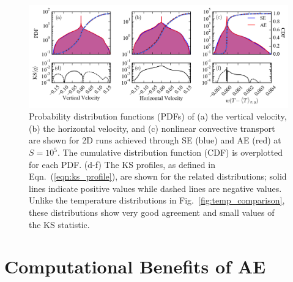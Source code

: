 \documentclass[aps, pre, onecolumn, nofootinbib, notitlepage, groupedaddress, amsfonts, amssymb, amsmath, longbibliography]{revtex4-1}
\begin{document}
\begin{figure}[t]
\includegraphics[width=\textwidth]{./figs/pdf_comparison.png}
\caption{Probability distribution functions (PDFs) of (a) the vertical velocity, (b) the horizontal velocity, and (c) nonlinear
convective transport are shown for 2D runs achieved through SE (blue) and AE (red)
at $S = 10^{5}$.  The cumulative distribution function (CDF) is overplotted for each PDF. 
(d-f) The KS profiles, as defined in Eqn.~(\ref{eqn:ks_profile}),
are shown for the related distributions; solid lines indicate positive values
while dashed lines are negative values. Unlike the temperature distributions in
Fig.~\ref{fig:temp_comparison}, these distributions
show very good agreement and small values of the KS statistic.
\label{fig:pdf_comparison} }
\end{figure}



\section{Computational Benefits of AE}
\label{sec:speedups}
\end{document}
